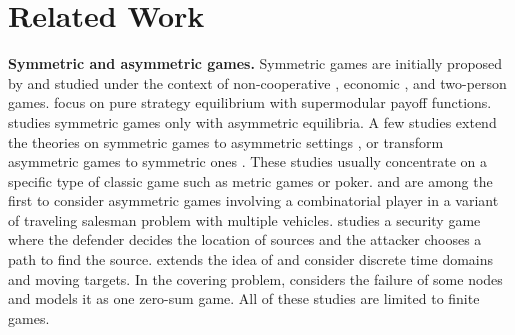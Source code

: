 \section{Related Work}


\textbf{Symmetric and asymmetric games.} Symmetric games are initially proposed by \citep{von1947theory} and studied under the context of non-cooperative \citep{nash1950non}, economic \citep{hammerstein1994game}, and two-person \citep{washburn2014two} games. \citet{amir2008symmetric} focus on pure strategy equilibrium with supermodular payoff functions. \citet{fey2012symmetric} studies symmetric games only with asymmetric equilibria. A few studies extend the theories on symmetric games to asymmetric settings \citep{cox2013provision,tuyls2018generalised}, or transform asymmetric games to symmetric ones \citep{tuyls2018generalised}. These studies usually concentrate on a specific type of classic game such as metric games or poker.
\citet{narasimha2013ant} and \citet{carlsson2009solving} are among the first to consider asymmetric games involving a combinatorial player in a variant of traveling salesman problem with multiple vehicles. \citet{jain2011double} studies a security game where the defender decides the location of sources and the attacker chooses a path to find the source. \citet{xu2014solving} extends the idea of \citet{jain2011double} and consider discrete time domains and moving targets. In the covering problem, \citet{rahmattalabi2019exploring} considers the failure of some nodes and models it as one zero-sum game. All of these studies are limited to finite games.



